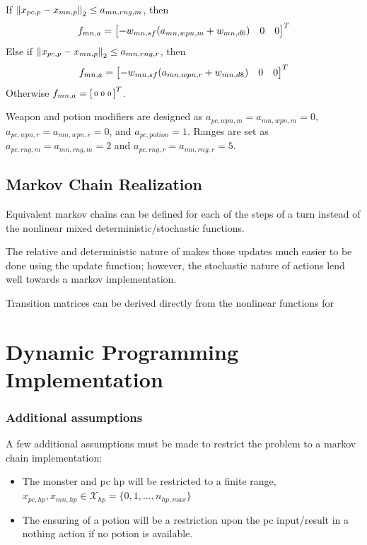 \documentclass[letterpaper, 10 pt, conference]{ieeeconf}
\begin{document}
If $\norm{x_{pc,p} - x_{mn,p}}_2 \leq a_{mn,rng,m}$, then \[
    f_{mn,a} = \mqty[-w_{mn,sf}(a_{mn,wpn,m} + w_{mn,d6}) & 0 & 0]^T
\]
Else if $\norm{x_{pc,p} - x_{mn,p}}_2 \leq  a_{mn,rng,r}$, then \[
    f_{mn,a} = \mqty[- w_{mn,sf}(a_{mn,wpn,r} + w_{mn,d8}) & 0 & 0]^T
\]
Otherwise $f_{mn,a} = \smqty[0 & 0 & 0]^T$.

Weapon and potion modifiers are designed as $a_{pc,wpn,m} = a_{mn,wpn,m} = 0$, $a_{pc,wpn,r} = a_{mn,wpn,r} = 0$, and $a_{pc,potion} = 1$.
Ranges are set as $a_{pc,rng,m}= a_{mn,rng,m} = 2$ and $ a_{pc,rng,r} =  a_{mn,rng,r} = 5$.

\subsection{Markov Chain Realization}
Equivalent markov chains can be defined for each of the steps of a turn instead of the nonlinear mixed deterministic/stochastic functions. 

The relative and deterministic nature of makes those updates much easier to be done using the update function; however, the stochastic nature of actions lend well towards a markov implementation.

Transition matrices can be derived directly from the nonlinear functions for 




\section{Dynamic Programming Implementation}








\subsubsection{Additional assumptions}
A few additional assumptions must be made to restrict the problem to a markov chain implementation:
\begin{itemize}
    \item The monster and pc hp will be restricted to a finite range, $x_{pc,hp},x_{mn,hp} \in \mathcal{X}_{hp} = \{0,1,\dots, n_{hp,max}\}$
    \item The ensuring of a potion will be a restriction upon the pc input/result in a nothing action if no potion is available.
\end{itemize}
\end{document}

